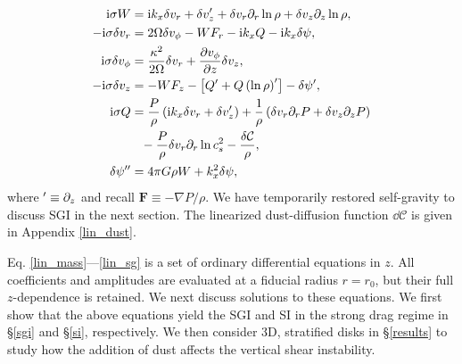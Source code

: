 \begin{align}
  \ii\sigma W &= \ii k_x \dd v_r + \dd v_z^\prime +
  \dd v_r \p_r\ln{\rho} + \dd v_z\p_z\ln{\rho},\label{lin_mass}\\
  -\ii\sigma\dd v_r  &= 2\Omega\dd v_\phi 
- W F_r - \ii k_x Q - \ii k_x\dd\psi,\label{lin_xmom}\\
  \ii\sigma\dd v_\phi &= \frac{\kappa^2}{2\Omega}\dd v_r + \frac{\p
    v_\phi}{\p z}\dd v_z, \label{lin_ymom}\\
  -\ii\sigma\dd v_z &= - W F_z - \left[Q^\prime + Q
    \left(\ln{\rho}\right)^\prime\right] - \dd\psi^\prime  %
,\label{lin_zmom}\\
  \ii\sigma Q &= \frac{P}{\rho}\left(\ii k_x \dd v_r + \dd
               v_z^\prime\right) + \frac{1}{\rho}\left(\dd v_r\p_rP + \dd v_z \p_zP\right)\notag\\
                &\phantom{=}-\frac{P}{\rho} \dd v_r\p_r
               \ln{c_s^2} %
               - \frac{\dd\mathcal{C}}{\rho},\label{lin_energy}\\
\dd\psi^{\prime\prime}  &= 4\pi G \rho W + k_x^2\dd\psi, \label{lin_sg}
\end{align}  
where $^\prime \equiv \partial_z$ and recall $\bm{F} \equiv -\nabla
P/\rho$. We have temporarily restored self-gravity  to
discuss SGI in the next
section. The linearized dust-diffusion function 
$\dd\mathcal{C}$ is given in  Appendix \ref{lin_dust}. 


Eq. \ref{lin_mass}---\ref{lin_sg} is a set of ordinary
differential equations in $z$. All coefficients and amplitudes are
evaluated at a fiducial radius $r=r_0$, but their full $z$-dependence
is retained. We next discuss solutions to these equations.  We first
show that the above equations yield the SGI and SI in the strong
drag regime in \S\ref{sgi} and \S\ref{si}, respectively. We then
consider 3D, stratified disks in \S\ref{results} to study how the addition of  dust 
affects the vertical shear instability. 

